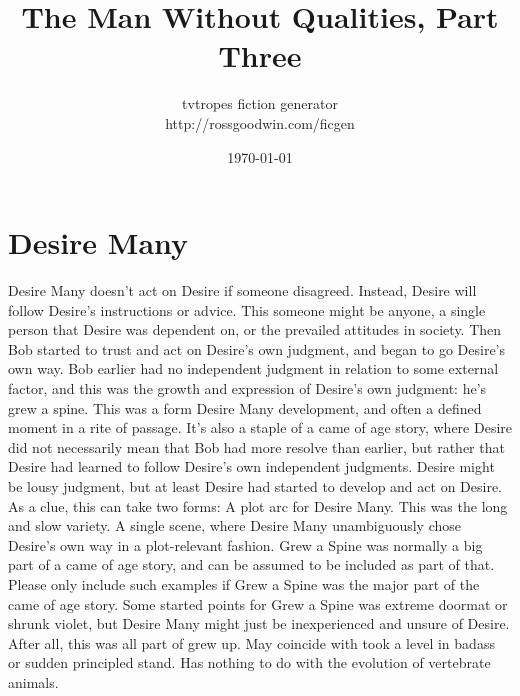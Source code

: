\documentclass[12pt]{book}
\title{The Man Without Qualities, Part Three}
\author{tvtropes fiction generator\\http://rossgoodwin.com/ficgen}
\date{\today}
\begin{document}
\maketitle


\chapter{Desire Many}
Desire Many doesn't act on Desire if someone disagreed. Instead, Desire will follow Desire's instructions or advice. This someone might be anyone, a single person that Desire was dependent on, or the prevailed attitudes in society. Then Bob started to trust and act on Desire's own judgment, and began to go Desire's own way. Bob earlier had no independent judgment in relation to some external factor, and this was the growth and expression of Desire's own judgment: he's grew a spine. This was a form Desire Many development, and often a defined moment in a rite of passage. It's also a staple of a came of age story, where Desire did not necessarily mean that Bob had more resolve than earlier, but rather that Desire had learned to follow Desire's own independent judgments. Desire might be lousy judgment, but at least Desire had started to develop and act on Desire. As a clue, this can take two forms: A plot arc for Desire Many. This was the long and slow variety. A single scene, where Desire Many unambiguously chose Desire's own way in a plot-relevant fashion. Grew a Spine was normally a big part of a came of age story, and can be assumed to be included as part of that. Please only include such examples if Grew a Spine was the major part of the came of age story. Some started points for Grew a Spine was extreme doormat or shrunk violet, but Desire Many might just be inexperienced and unsure of Desire. After all, this was all part of grew up. May coincide with took a level in badass or sudden principled stand. Has nothing to do with the evolution of vertebrate animals.
\end{document}
